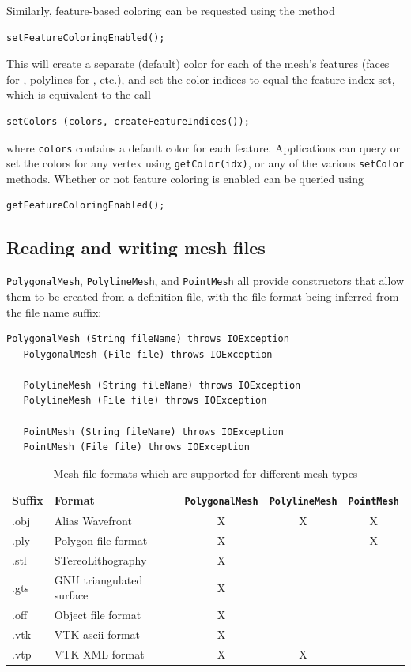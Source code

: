 Similarly, feature-based coloring can be requested using the method
\begin{lstlisting}[]
   setFeatureColoringEnabled();
\end{lstlisting}
%
This will create a separate (default) color for each of the mesh's
features (faces for 
, polylines for
, etc.),
and set the color indices to equal the feature 
index set, which is equivalent to the call
%
\begin{lstlisting}[]
   setColors (colors, createFeatureIndices());
\end{lstlisting}
%
where {\tt colors} contains a default color for each feature.
Applications can query or set the colors
for any vertex using {\tt getColor(idx)}, or any of the
various {\tt setColor} methods. Whether or not feature coloring
is enabled can be queried using
\begin{lstlisting}[]
   getFeatureColoringEnabled();
\end{lstlisting}
%

\subsection{Reading and writing mesh files}
\label{MeshFileIO:sec}

{\tt PolygonalMesh}, {\tt PolylineMesh}, and {\tt PointMesh} all
provide constructors that allow them to be created from a definition
file, with the file format being inferred from the file name
suffix:
\begin{lstlisting}[]
   PolygonalMesh (String fileName) throws IOException
   PolygonalMesh (File file) throws IOException

   PolylineMesh (String fileName) throws IOException
   PolylineMesh (File file) throws IOException

   PointMesh (String fileName) throws IOException
   PointMesh (File file) throws IOException
\end{lstlisting}
%
\begin{table}[h]
\centering
\begin{tabular}{|ll|ccc|}
\hline
Suffix & Format & {\tt PolygonalMesh} & {\tt PolylineMesh} & {\tt PointMesh} \\
\hline
.obj & Alias Wavefront &X&X&X\\
.ply & Polygon file format &X&&X\\
.stl & STereoLithography &X&&\\
.gts & GNU triangulated surface &X&&\\
.off & Object file format &X&&\\
.vtk & VTK ascii format &X&&\\
.vtp & VTK XML format &X&X&\\
\hline
\end{tabular}
\caption{Mesh file formats which are supported for different mesh types}
\label{meshFormatSupport:tbl}
\end{table}


